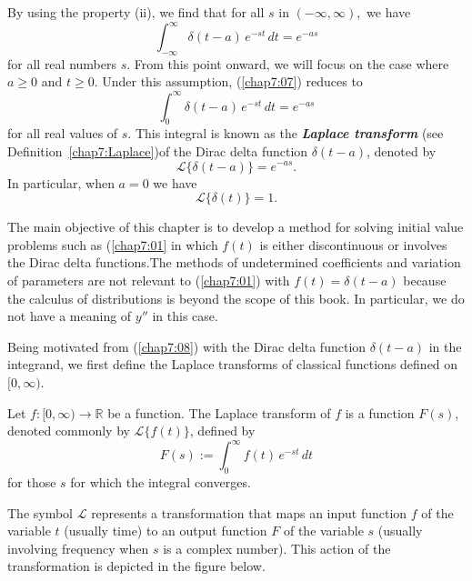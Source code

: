    By using the property (ii), we  find that for all $s$ in $(-\infty,  \infty),$ we have 
\begin{equation}\label{chap7:07}
	\int_{-\infty}^\infty \delta(t - a)\, e^{-st}\, dt = e^{-as} \end{equation}
for all real numbers $s.$
From this point onward, we will focus on the case where \( a \ge 0 \) and \( t \ge 0 \). Under this assumption,  (\ref{chap7:07}) reduces to  
 \begin{equation}\label{chap7:08}
	 \int_0^\infty \delta(t - a)\, e^{-st}\, dt = e^{-as}
	 \end{equation}
 for all real values of \( s \).  
 This integral is known as the \textbf{\textit{Laplace transform}} (see Definition~\ref{chap7:Laplace})of the Dirac delta function \( \delta(t - a) \),  denoted by  
 \[
 \mathscr{L}\{\delta(t - a)\} = e^{-as}.
 \]  
 In particular, when $a=0$ we have 
 \[
 \mathscr{L}\{\delta(t)\} = 1.
 \]
 
 

 The main objective of this chapter is to develop a method for solving initial value problems such as (\ref{chap7:01} in which $f(t)$ is either discontinuous or involves the Dirac delta functions.The methods of undetermined coefficients and  variation of parameters are not relevant to (\ref{chap7:01}) with $f(t) = \delta (t-a)$  because the calculus of distributions is beyond the scope of this book.   In particular,  we do not have a meaning of $y''$ in this case.
 
 Being motivated from  (\ref{chap7:08}) with the Dirac delta function \(\delta(t - a)\) in the integrand, we first define the Laplace transforms of classical functions defined on $[0, \infty).$

\begin{definition}\label{chap7:Laplace}
Let $f:[0, \infty)\to\mathbb R$ be a function. The Laplace transform  of $f$  is a function $F(s)$, denoted commonly by $\mathscr{L}\{f(t)\}$, defined by
 \[F(s):=\int_0^\infty f(t)\, e^{-st} \, dt\]  for those $s$ for which the integral converges.
\end{definition}






The symbol $\mathscr{L}$ represents a transformation that maps an input function $f$ of the variable $t$ (usually time) to an output function $F$ of the variable $s$ (usually involving frequency when 
$s$ is a complex number). This action of the transformation is depicted in the figure below.


